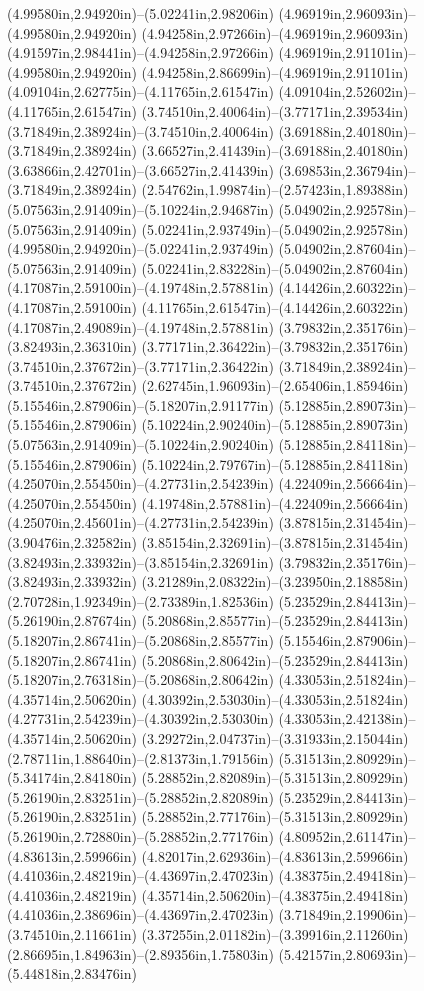 (4.99580in,2.94920in)--(5.02241in,2.98206in) (4.96919in,2.96093in)--(4.99580in,2.94920in) (4.94258in,2.97266in)--(4.96919in,2.96093in) (4.91597in,2.98441in)--(4.94258in,2.97266in) (4.96919in,2.91101in)--(4.99580in,2.94920in) (4.94258in,2.86699in)--(4.96919in,2.91101in) (4.09104in,2.62775in)--(4.11765in,2.61547in) (4.09104in,2.52602in)--(4.11765in,2.61547in) (3.74510in,2.40064in)--(3.77171in,2.39534in) (3.71849in,2.38924in)--(3.74510in,2.40064in) (3.69188in,2.40180in)--(3.71849in,2.38924in) (3.66527in,2.41439in)--(3.69188in,2.40180in) (3.63866in,2.42701in)--(3.66527in,2.41439in) (3.69853in,2.36794in)--(3.71849in,2.38924in) (2.54762in,1.99874in)--(2.57423in,1.89388in) (5.07563in,2.91409in)--(5.10224in,2.94687in) (5.04902in,2.92578in)--(5.07563in,2.91409in) (5.02241in,2.93749in)--(5.04902in,2.92578in) (4.99580in,2.94920in)--(5.02241in,2.93749in) (5.04902in,2.87604in)--(5.07563in,2.91409in) (5.02241in,2.83228in)--(5.04902in,2.87604in) (4.17087in,2.59100in)--(4.19748in,2.57881in) (4.14426in,2.60322in)--(4.17087in,2.59100in) (4.11765in,2.61547in)--(4.14426in,2.60322in) (4.17087in,2.49089in)--(4.19748in,2.57881in) (3.79832in,2.35176in)--(3.82493in,2.36310in) (3.77171in,2.36422in)--(3.79832in,2.35176in) (3.74510in,2.37672in)--(3.77171in,2.36422in) (3.71849in,2.38924in)--(3.74510in,2.37672in) (2.62745in,1.96093in)--(2.65406in,1.85946in) (5.15546in,2.87906in)--(5.18207in,2.91177in) (5.12885in,2.89073in)--(5.15546in,2.87906in) (5.10224in,2.90240in)--(5.12885in,2.89073in) (5.07563in,2.91409in)--(5.10224in,2.90240in) (5.12885in,2.84118in)--(5.15546in,2.87906in) (5.10224in,2.79767in)--(5.12885in,2.84118in) (4.25070in,2.55450in)--(4.27731in,2.54239in) (4.22409in,2.56664in)--(4.25070in,2.55450in) (4.19748in,2.57881in)--(4.22409in,2.56664in) (4.25070in,2.45601in)--(4.27731in,2.54239in) (3.87815in,2.31454in)--(3.90476in,2.32582in) (3.85154in,2.32691in)--(3.87815in,2.31454in) (3.82493in,2.33932in)--(3.85154in,2.32691in) (3.79832in,2.35176in)--(3.82493in,2.33932in) (3.21289in,2.08322in)--(3.23950in,2.18858in) (2.70728in,1.92349in)--(2.73389in,1.82536in) (5.23529in,2.84413in)--(5.26190in,2.87674in) (5.20868in,2.85577in)--(5.23529in,2.84413in) (5.18207in,2.86741in)--(5.20868in,2.85577in) (5.15546in,2.87906in)--(5.18207in,2.86741in) (5.20868in,2.80642in)--(5.23529in,2.84413in) (5.18207in,2.76318in)--(5.20868in,2.80642in) (4.33053in,2.51824in)--(4.35714in,2.50620in) (4.30392in,2.53030in)--(4.33053in,2.51824in) (4.27731in,2.54239in)--(4.30392in,2.53030in) (4.33053in,2.42138in)--(4.35714in,2.50620in) (3.29272in,2.04737in)--(3.31933in,2.15044in) (2.78711in,1.88640in)--(2.81373in,1.79156in) (5.31513in,2.80929in)--(5.34174in,2.84180in) (5.28852in,2.82089in)--(5.31513in,2.80929in) (5.26190in,2.83251in)--(5.28852in,2.82089in) (5.23529in,2.84413in)--(5.26190in,2.83251in) (5.28852in,2.77176in)--(5.31513in,2.80929in) (5.26190in,2.72880in)--(5.28852in,2.77176in) (4.80952in,2.61147in)--(4.83613in,2.59966in) (4.82017in,2.62936in)--(4.83613in,2.59966in) (4.41036in,2.48219in)--(4.43697in,2.47023in) (4.38375in,2.49418in)--(4.41036in,2.48219in) (4.35714in,2.50620in)--(4.38375in,2.49418in) (4.41036in,2.38696in)--(4.43697in,2.47023in) (3.71849in,2.19906in)--(3.74510in,2.11661in) (3.37255in,2.01182in)--(3.39916in,2.11260in) (2.86695in,1.84963in)--(2.89356in,1.75803in) (5.42157in,2.80693in)--(5.44818in,2.83476in) 